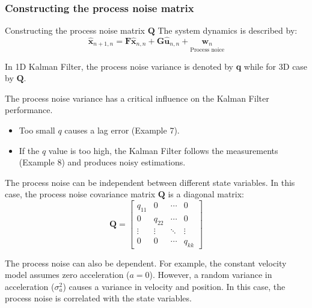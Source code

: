 \subsubsection{Constructing the process noise matrix}
\begin{frame}{Constructing the process noise matrix $\mathbf{Q}$}
The system dynamics is described by:
\begin{equation*}
\mathbf{\hat{x}}_{n+1,n} = \mathbf{F}\mathbf{\hat{x}}_{n,n} + \mathbf{G}\mathbf{\hat{u}}_{n,n} + \underset{\text{Process noice}}{\mathbf{w}_n}
\end{equation*}     

In 1D Kalman Filter, the process noise variance is denoted by \textbf{q} while for 3D case by $\mathbf{Q}$. 

The process noise variance has a critical influence on the Kalman
Filter performance. 
\begin{itemize}
    \item Too small $q$ causes a lag error (Example 7).
    \item If the $q$ value is too high, the Kalman Filter follows the measurements (Example 8) and produces noisy estimations.
\end{itemize}

The process noise can be independent between different state variables. In this case, the process noise covariance matrix \( \mathbf{Q} \) is a diagonal matrix:
\begin{equation}
\mathbf{Q} = 
\begin{bmatrix}
q_{11} & 0 & \cdots & 0 \\
0 & q_{22} & \cdots & 0 \\
\vdots & \vdots & \ddots & \vdots \\
0 & 0 & \cdots & q_{kk}
\end{bmatrix}
\tag{8.32}
\end{equation}

The process noise can also be dependent. For example, the constant velocity model assumes zero acceleration (\(a = 0\)). However, a random variance in acceleration (\(\sigma^2_a\)) causes a variance in velocity and position. In this case, the process noise is correlated with the state variables.
\end{frame}


